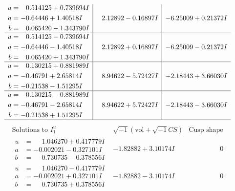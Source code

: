 \documentclass[1p]{elsarticle_modified}
\theoremstyle{definition}
\newcommand{\I}{\sqrt{-1}}
\begin{document}
$$\begin{array}{c|c|c}
\begin{aligned}
u &= \phantom{-}0.514125 + 0.739694 I \\
a &= -0.64446 + 1.40518 I \\
b &= \phantom{-}0.065420 - 1.343790 I\end{aligned}
 & \phantom{-}2.12892 - 0.16897 I & -6.25009 + 0.21372 I \\ \hline\begin{aligned}
u &= \phantom{-}0.514125 - 0.739694 I \\
a &= -0.64446 - 1.40518 I \\
b &= \phantom{-}0.065420 + 1.343790 I\end{aligned}
 & \phantom{-}2.12892 + 0.16897 I & -6.25009 - 0.21372 I \\ \hline\begin{aligned}
u &= \phantom{-}0.130215 + 0.881989 I \\
a &= -0.46791 + 2.65814 I \\
b &= -0.21538 - 1.51295 I\end{aligned}
 & \phantom{-}8.94622 - 5.72427 I & -2.18443 + 3.66030 I \\ \hline\begin{aligned}
u &= \phantom{-}0.130215 - 0.881989 I \\
a &= -0.46791 - 2.65814 I \\
b &= -0.21538 + 1.51295 I\end{aligned}
 & \phantom{-}8.94622 + 5.72427 I & -2.18443 - 3.66030 I\\
 \hline 
 \end{array}$$\newpage$$\begin{array}{c|c|c}  
\text{Solutions to }I^u_{1}& \I (\text{vol} + \sqrt{-1}CS) & \text{Cusp shape}\\
 \hline 
\begin{aligned}
u &= \phantom{-}1.046270 + 0.417779 I \\
a &= -0.002021 - 0.327101 I \\
b &= \phantom{-}0.730735 - 0.378556 I\end{aligned}
 & -1.82882 + 3.10174 I & \phantom{-0.000000 } 0 \\ \hline\begin{aligned}
u &= \phantom{-}1.046270 - 0.417779 I \\
a &= -0.002021 + 0.327101 I \\
b &= \phantom{-}0.730735 + 0.378556 I\end{aligned}
 & -1.82882 - 3.10174 I & \phantom{-0.000000 } 0 \\ \hline\begin{aligned}

\end{aligned}
\end{array}$$
\end{document}
